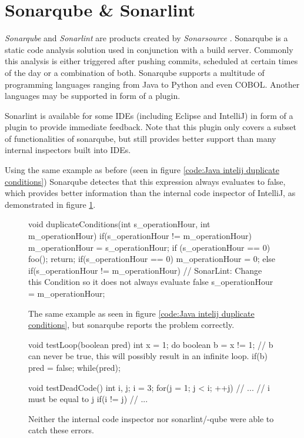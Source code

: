 \section{Sonarqube \& Sonarlint} %
\label{sec:sonar}
\emph{Sonarqube} \cite{sonarqube} and \emph{Sonarlint} \cite{SonarLintFixIssues} are products created by \emph{Sonarsource} \cite{CodeQualityCode}. Sonarqube is a static code analysis solution used in conjunction with a build server.
Commonly this analysis is either triggered after pushing commits, scheduled at certain times of the day or a combination of both.
Sonarqube supports a multitude of programming languages ranging from Java to Python and even COBOL. Another languages may be supported in form of a plugin.


Sonarlint is available for some IDEs (including Eclipse and IntelliJ) in form of a plugin to provide immediate feedback. Note that this plugin only covers a subset of functionalities of sonarqube, but still provides better support than many internal inspectors built into IDEs.


Using the same example as before (seen in figure \ref{code:Java intelij duplicate conditions}) Sonarqube detectes that this expression always evaluates to false, which provides better information than the internal code inspector of IntelliJ, as demonstrated in figure \ref{code:Java sonarqube duplicate conditions}.

\begin{figure}
	\begin{JavaCode}
		void duplicateConditions(int s_operationHour, int m_operationHour) {
			if(s_operationHour != m_operationHour) {
				m_operationHour = s_operationHour;
				if (s_operationHour == 0) {
					foo();        
				}
				return;
			}
			if(s_operationHour == 0) {
				m_operationHour = 0;
			} else {
				if(s_operationHour != m_operationHour) { // SonarLint: Change this Condition so it does not always evaluate false
					s_operationHour = m_operationHour;
				}
			}
	}\end{JavaCode}
	\caption{The same example as seen in figure \ref{code:Java intelij duplicate conditions}, but sonarqube reports the problem correctly. }
	\label{code:Java sonarqube duplicate conditions}
\end{figure}

\begin{figure}
	\begin{JavaCode}
void testLoop(boolean pred) {
	int x = 1;
	do {
		boolean b = x != 1;
		// b can never be true, this will possibly result in an infinite loop.
		if(b) {
			pred = false;
		}
	} while(pred);
}

void testDeadCode() {
	int i, j;
	i = 3;
	for(j = 1; j < i; ++j) {
		// ...
	}
	// i must be equal to j
	if(i != j) { 
		// ...
	}
}\end{JavaCode}
	\caption{Neither the internal code inspector nor sonarlint/-qube were able to catch these errors. }
	\label{code:Java sonarqube hard example}
\end{figure}

